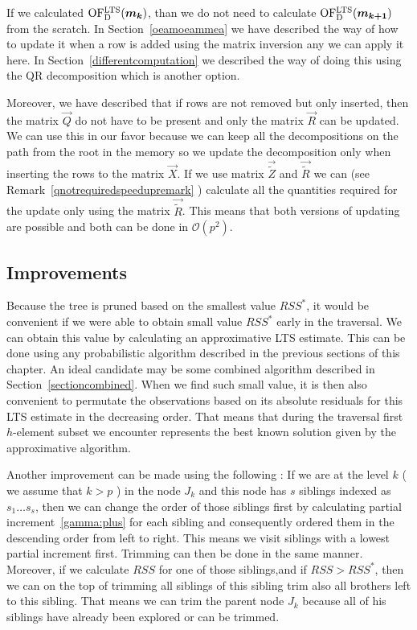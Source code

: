 \begin{remark}
If we calculated $\operatorname{OF^{LTS}_D}(\boldsymbol{m_{k}})$, than we do not need to calculate $\operatorname{OF^{LTS}_D}(\boldsymbol{m_{k+1}})$ from the scratch. In Section~\ref{oeamoeammea} we have described the way of how to update it when a row is added using the matrix inversion any we can apply it here. In Section~\ref{differentcomputation} we described the way of doing this using the QR decomposition which is another option. 

Moreover, we have described that if rows are not removed but only inserted, then the matrix $\vec{Q}$ do not have to be present and only the matrix $\vec{R}$ can be updated. We can use this in our favor because we can keep all the decompositions on the path from the root in the memory so we update the decomposition only when inserting the rows to the matrix $\vec{X}$.  If we use matrix $\vec{\tilde{Z}}$ and $\vec{\tilde{R}}$ we can  (see Remark~\ref{qnotrequiredspeedupremark} ) calculate all the quantities required for the update only using the matrix $\vec{\tilde{R}}$. This means that both versions of updating are possible and both can be done in $\mathcal{O}(p^2)$.
\end{remark}

\subsection{Improvements}
Because the tree is pruned based on the smallest value $RSS^*$, it would be convenient if we were able to obtain small value $RSS^*$ early in the traversal. We can obtain this value by calculating an approximative LTS estimate. This can be done using any probabilistic algorithm described in the previous sections of this chapter. An ideal candidate may be some combined algorithm described in Section~\ref{sectioncombined}. When we find such small value, it is then also convenient to permutate the observations based on its absolute residuals for this LTS estimate in the decreasing order. That means that during the traversal first $h$-element subset we encounter represents the best known solution given by the approximative algorithm.

Another improvement can be made using the following : If we are at the level $k$ ( we assume that $k > p$ )
in the node $J_k$ and this node has $s$ siblings indexed as $s_1 \ldots s_s$, then we can change the order of those siblings first by calculating partial increment~\eqref{gamma:plus} for each sibling and consequently ordered them in the descending order from left to right. This means we visit siblings with a lowest partial increment first. Trimming can then be done in the same manner. Moreover, if we calculate $RSS$ for one of those siblings,and if $RSS > RSS^*$, then we can on the top of trimming all siblings of this sibling trim also all brothers left to this sibling. That means we can trim the parent node $J_k$ because all of his siblings have already been explored or can be trimmed.

